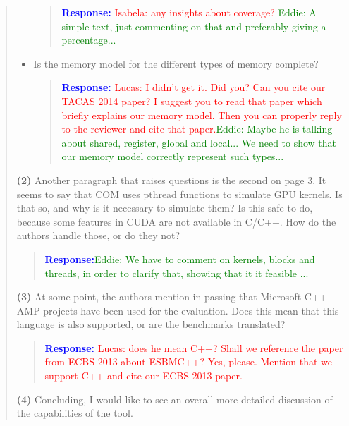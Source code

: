\documentclass[11pt]{article}
\begin{document}
\begin{quote}
\begin{itemize}
  \begin{quote}
  \textcolor{blue}{\textbf{Response:} \textcolor{red}{Isabela: any insights about coverage?} \textcolor{green}{Eddie: A simple text, just commenting on that and preferably giving a percentage...}}
  \end{quote}
  
  \item Is the memory model for the different types of memory complete?
  
  \begin{quote}
  \textcolor{blue}{\textbf{Response:} \textcolor{red}{Lucas: I didn't get it. Did you? Can you cite our TACAS 2014 paper? I suggest you to read that paper which briefly explains our memory model. Then you can properly reply to the reviewer and cite that paper.}\textcolor{green}{Eddie: Maybe he is talking about shared, register, global and local... We need to show that our memory model correctly represent such types...}}
  \end{quote}
  
  \end{itemize}

{\bf (2)} Another paragraph that raises questions is the second on page 3. It seems to say that COM uses pthread functions to simulate GPU kernels. Is that so, and why is it necessary to simulate them? Is this safe to do, because some features in CUDA are not available in C/C++. How do the authors handle those, or do they not?

\begin{quote}
\textcolor{blue}{\textbf{Response:}\textcolor{green}{Eddie: We have to comment on kernels, blocks and threads, in order to clarify that, showing that it it feasible ...}}
\end{quote}

{\bf (3)} At some point, the authors mention in passing that Microsoft C++ AMP projects have been used for the evaluation. Does this mean that this language is also supported, or are the benchmarks translated?

\begin{quote}
\textcolor{blue}{\textbf{Response:} \textcolor{red}{Lucas: does he mean C++? Shall we reference the paper from ECBS 2013 about ESBMC++? Yes, please. Mention that we support C++ and cite our ECBS 2013 paper.}}
\end{quote}

{\bf (4)} Concluding, I would like to see an overall more detailed discussion of the capabilities of the tool.


\end{quote}
\end{document}
